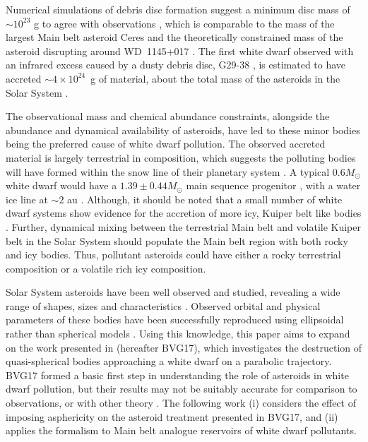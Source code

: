 \documentclass[fleqn,usenatbib]{mnras}
\begin{document}
Numerical simulations of debris disc formation suggest a minimum disc mass of $\sim 10^{23}$ g to agree with observations \citep{Kenyon2017, VanLieshout2018, Farihi2018}, which is comparable to the mass of the largest Main belt asteroid Ceres and the theoretically constrained mass of the asteroid disrupting around WD~1145+017 \citep{Rappaport2016, Gurri2017}.
The first white dwarf observed with an infrared excess caused by a dusty debris disc, G29-38 \citep{Zuckerman1987}, is estimated to have accreted $\sim 4 \times 10^{24}$~g of material, about the total mass of the asteroids in the Solar System \citep{Jura2003}. 

The observational mass and chemical abundance constraints, alongside the abundance and dynamical availability of asteroids, have led to these minor bodies being the preferred cause of white dwarf pollution. 
The observed accreted material is largely terrestrial in composition, which suggests the polluting bodies will have formed within the snow line of their planetary system \citep{Martin2020}.
A typical $0.6 M_\odot$ white dwarf would have a $1.39 \pm 0.44 M_\odot$ main sequence progenitor \citep[see eq. 4 of][]{Cummings2018}, with a water ice line at $\sim 2$ au \citep{Adams1986, Kenyon1987, Chiang1997, Kennedy2008}. 
Although, it should be noted that a small number of white dwarf systems show evidence for the accretion of more icy, Kuiper belt like bodies \citep{Farihi2013, Raddi2015, GentileFusillo2017, Xu2017, Hoskin2020}.
Further, dynamical mixing between the terrestrial Main belt and volatile Kuiper belt in the Solar System should populate the Main belt region with both rocky and icy bodies.
Thus, pollutant asteroids could have either a rocky terrestrial composition or a volatile rich icy composition.


Solar System asteroids have been well observed and studied, revealing a wide range of shapes, sizes and characteristics \citep{Warner2009, Durech2018}.
Observed orbital and physical parameters of these bodies have been successfully reproduced using ellipsoidal rather than spherical models \citep{Carbognani2012, Dobrovolskis2019}.
Using this knowledge, this paper aims to expand on the work presented in \cite{Brown2017} (hereafter BVG17), which investigates the destruction of quasi-spherical bodies approaching a white dwarf on a parabolic trajectory.
BVG17 formed a basic first step in understanding the role of asteroids in white dwarf pollution, but their results may not be suitably accurate for comparison to observations, or with other theory \citep[e.g.][]{Wyatt2014}.
The following work (i) considers the effect of imposing asphericity on the asteroid treatment presented in BVG17, and (ii) applies the formalism to Main belt analogue reservoirs of white dwarf pollutants.
\end{document}
